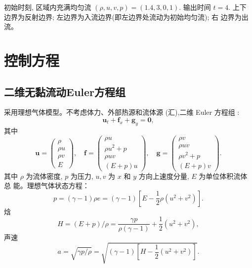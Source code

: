 \documentclass[12pt]{article}
\begin{document}
初始时刻, 区域内充满均匀流 $(\rho, u, v, p)=(1.4,3,0,1) .$ 输出时间 $t=4 .$ 上下边界为反射边界; 左边界为入流边界(即左边界处流动为初始均匀流); 右 边界为出流。


\section{控制方程}

\subsection{二维无黏流动Euler方程组}

采用理想气体模型。不考虑体力、外部热源和流体源 (汇),二维 Euler 方程组 :
\begin{equation}
	\bm{u}_{t}+\bm{f}_{x}+\bm{g}_{y}=\mathbf{0},
	\label{eq:2DEuler}
\end{equation}
其中
\begin{equation}
	\bm{u}=\left(\begin{array}{c}
			\rho   \\
			\rho u \\
			\rho v \\
			E
		\end{array}\right), \quad \bm{f}=\left(\begin{array}{c}
			\rho u       \\
			\rho u^{2}+p \\
			\rho u v     \\
			(E+p) u
		\end{array}\right), \quad \bm{g}=\left(\begin{array}{c}
			\rho v       \\
			\rho u v     \\
			\rho v^{2}+p \\
			(E+p) v
		\end{array}\right).
\end{equation}
其中 $\rho$ 为流体密度, $p$ 为压力, $u, v$ 为 $x$ 和 $y$ 方向上速度分量, $E$ 为单位体积流体总
能。理想气体状态方程：
\begin{equation}
	p=(\gamma-1) \rho e=(\gamma-1)\left[E-\frac{1}{2} \rho\left(u^{2}+v^{2}\right)\right].
\end{equation}
焓
\begin{equation}
	H=(E+p) / \rho=\frac{\gamma p}{\rho(\gamma-1)}+\frac{1}{2}\left(u^2+v^2\right),
\end{equation}
声速
\begin{equation}
	a=\sqrt{\gamma p / \rho}=\sqrt{(\gamma-1)\left[H-\frac{1}{2}\left(u^2+v^2\right)\right]}.
\end{equation}
\end{document}
